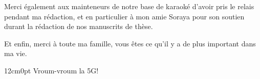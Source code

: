 \documentclass[../main.tex]{subfiles}
\begin{document}
\begin{acknowledgements}
Merci également aux mainteneurs de notre base de karaoké d’avoir pris le relais pendant ma rédaction, et en particulier à mon amie Soraya pour son soutien durant la rédaction de nos manuscrits de thèse.

Et enfin, merci à toute ma famille, vous êtes ce qu’il y a de plus important dans ma vie.

\vfill
\begin{adjustwidth}{12cm}{0pt}
Vroum-vroum la 5G!
\end{adjustwidth}


\end{acknowledgements}
\end{document}
